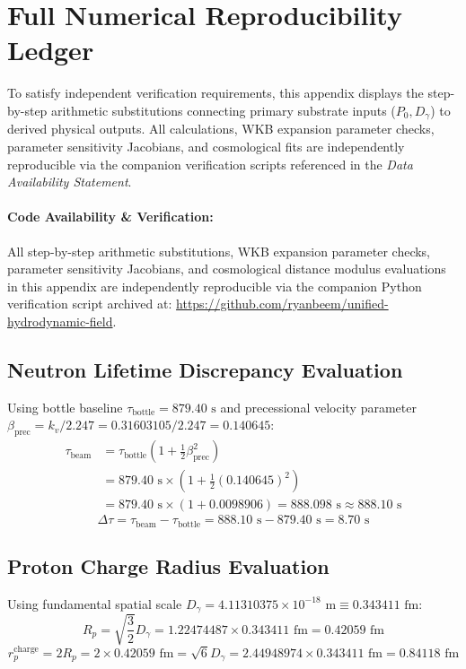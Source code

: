 \documentclass[11pt,a4paper]{article}
\begin{document}
	\section{Full Numerical Reproducibility Ledger}
	To satisfy independent verification requirements, this appendix displays the step-by-step arithmetic substitutions connecting primary substrate inputs ($P_0, D_\gamma$) to derived physical outputs. All calculations, WKB expansion parameter checks, parameter sensitivity Jacobians, and cosmological fits are independently reproducible via the companion verification scripts referenced in the \textit{Data Availability Statement}.
	
	\paragraph{Code Availability \& Verification:}
	All step-by-step arithmetic substitutions, WKB expansion parameter checks, parameter sensitivity Jacobians, and cosmological distance modulus evaluations in this appendix are independently reproducible via the companion Python verification script archived at: \url{https://github.com/ryanbeem/unified-hydrodynamic-field}.
	
	\subsection{Neutron Lifetime Discrepancy Evaluation}
	Using bottle baseline $\tau_{\text{bottle}} = 879.40\text{ s}$ and precessional velocity parameter $\beta_{\text{prec}} = k_v / 2.247 = 0.31603105 / 2.247 = 0.140645$:
	\begin{align}
		\tau_{\text{beam}} &= \tau_{\text{bottle}} \left(1 + \frac{1}{2} \beta_{\text{prec}}^2\right) \nonumber \\
		&= 879.40\text{ s} \times \left(1 + \frac{1}{2}(0.140645)^2\right) \nonumber \\
		&= 879.40\text{ s} \times (1 + 0.0098906) = 888.098\text{ s} \approx 888.10\text{ s}
	\end{align}
	\begin{equation}
		\Delta\tau = \tau_{\text{beam}} - \tau_{\text{bottle}} = 888.10\text{ s} - 879.40\text{ s} = 8.70\text{ s}
	\end{equation}
	
	\subsection{Proton Charge Radius Evaluation}
	Using fundamental spatial scale $D_\gamma = 4.11310375 \times 10^{-18}\text{ m} \equiv 0.343411\text{ fm}$:
	\begin{equation}
		R_p = \sqrt{\frac{3}{2}} D_\gamma = 1.22474487 \times 0.343411\text{ fm} = 0.42059\text{ fm}
	\end{equation}
	\begin{equation}
		r_p^{\text{charge}} = 2 R_p = 2 \times 0.42059\text{ fm} = \sqrt{6} D_\gamma = 2.44948974 \times 0.343411\text{ fm} = 0.84118\text{ fm}
	\end{equation}
	
\end{document}

